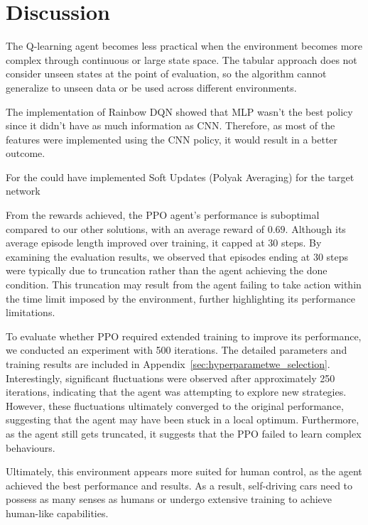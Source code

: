 \documentclass{article}
\begin{document}
\section{Discussion}

The Q-learning agent becomes less practical when the environment becomes more complex through continuous or large state space. The tabular approach does not consider unseen states at the point of evaluation, so the algorithm cannot generalize to unseen data or be used across different environments. 

The implementation of Rainbow DQN showed that MLP wasn't the best policy since it didn't have as much information as CNN.
Therefore, as most of the features were implemented using the CNN policy, it would result in a better outcome.


For the could have implemented Soft Updates (Polyak Averaging) for the target network


From the rewards achieved, the PPO agent's performance is suboptimal compared to our other solutions, with an average reward of $0.69$. Although its average episode length improved over training, it capped at 30 steps. By examining the evaluation results, we observed that episodes ending at 30 steps were typically due to truncation rather than the agent achieving the done condition. This truncation may result from the agent failing to take action within the time limit imposed by the environment, further highlighting its performance limitations.

To evaluate whether PPO required extended training to improve its performance, we conducted an experiment with 500 iterations. The detailed parameters and training results are included in Appendix~\ref{sec:hyperparametwe_selection}. Interestingly, significant fluctuations were observed after approximately 250 iterations, indicating that the agent was attempting to explore new strategies. However, these fluctuations ultimately converged to the original performance, suggesting that the agent may have been stuck in a local optimum. Furthermore, as the agent still gets truncated, it suggests that the PPO failed to learn complex behaviours.

Ultimately, this environment appears more suited for human control, as the agent achieved the best performance and results.
As a result, self-driving cars need to possess as many senses as humans or undergo extensive training to achieve human-like capabilities.
\end{document}
